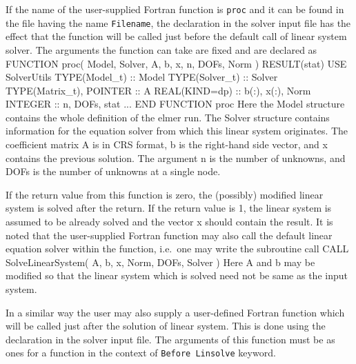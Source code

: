 If the name of the user-supplied Fortran function is {\tt proc} and it 
can be found in the file having the name {\tt Filename}, the declaration
\sifbegin
{}
\sifend
in the solver input file has the effect that the function will be called just
before the default call of linear system solver.
The arguments the function can take are fixed and are declared as  
\ttbegin
   FUNCTION proc( Model, Solver, A,  b, x, n, DOFs, Norm ) RESULT(stat)
      USE SolverUtils
      TYPE(Model_t)  :: Model
      TYPE(Solver_t) :: Solver
      TYPE(Matrix_t), POINTER :: A
      REAL(KIND=dp) :: b(:), x(:), Norm
      INTEGER :: n, DOFs, stat 
      ...
   END FUNCTION proc
\ttend
Here the Model structure contains the whole definition of the elmer run. The Solver structure
contains information for the equation solver from which this linear system originates. 
The coefficient matrix A is in CRS format, b is the right-hand side vector, 
and x contains the previous solution. The argument n is the number of 
unknowns, and DOFs is the number of unknowns at a single node. 

If the return value from this function is zero, the (possibly) modified linear system is solved
after the return. If the return value is 1, the linear system is assumed to be already solved
and the vector x should contain the result. It is noted that the user-supplied Fortran function  
may also call the default linear equation solver within the function, i.e.\ one may write
the subroutine call
\ttbegin
   CALL SolveLinearSystem( A, b, x, Norm, DOFs, Solver )
\ttend
Here A and b may be modified so that the linear system which is solved need not be 
same as the input system.

In a similar way the user may also supply a user-defined Fortran function which
will be called just after the solution of linear system. This is done using the 
declaration
\sifbegin
{}
\sifend
in the solver input file. The arguments of this function must be as ones for a  
function in the context of {\tt Before Linsolve} keyword.






